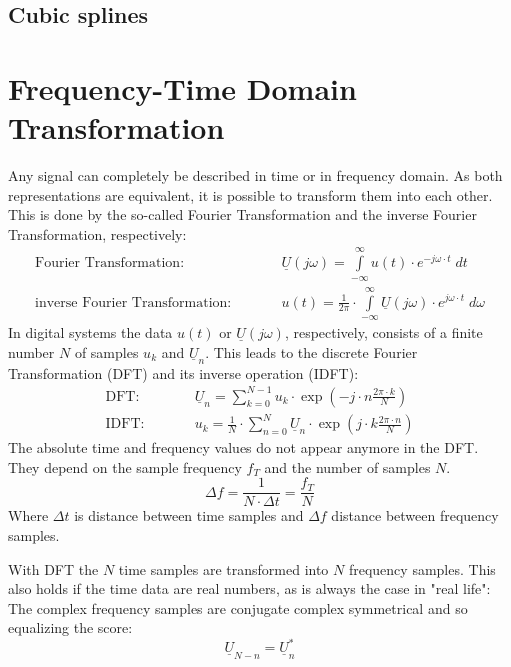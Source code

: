 \subsection{Cubic splines}


\section{Frequency-Time Domain Transformation}

Any signal can completely be described in time or in frequency domain.
As both representations are equivalent, it is possible to transform them
into each other. This is done by the so-called Fourier Transformation and
the inverse Fourier Transformation, respectively:
\begin{eqnarray}
\text{Fourier Transformation:} & \qquad &
     \underline{U}(j\omega) =
     \int\limits_{-\infty}^{\infty} u(t)\cdot e^{-j\omega\cdot t} \; dt \\
\text{inverse Fourier Transformation:} & \qquad &
     u(t) = \frac{1}{2\pi} \cdot \int\limits_{-\infty}^{\infty}
            \underline{U}(j\omega)\cdot e^{j\omega\cdot t} \; d\omega
\end{eqnarray}
In digital systems the data $u(t)$ or $\underline{U}(j\omega)$,
respectively, consists of a finite number $N$ of samples $u_k$ and
$\underline{U}_n$. This leads to the discrete Fourier Transformation
(DFT) and its inverse operation (IDFT):
\begin{eqnarray}
\label{eqn:DFT}
\text{DFT:} & \qquad &
     \underline{U}_n =
     \sum_{k=0}^{N-1} u_k\cdot \exp\left( -j\cdot n\frac{2\pi\cdot k}{N} \right) \\
\label{eqn:IDFT}
\text{IDFT:} & \qquad &
     u_k = \frac{1}{N} \cdot \sum_{n=0}^{N}
            \underline{U}_n\cdot \exp\left( j\cdot k\frac{2\pi\cdot n}{N} \right)
\end{eqnarray}
The absolute time and frequency values do not appear anymore in the DFT.
They depend on the sample frequency $f_T$ and the number of samples $N$.
\begin{equation}
\Delta f = \frac{1}{N\cdot\Delta t} = \frac{f_T}{N}
\end{equation}
Where $\Delta t$ is distance between time samples and $\Delta f$
distance between frequency samples.

\addvspace{12pt}

With DFT the $N$ time samples are transformed into $N$ frequency samples.
This also holds if the time data are real numbers, as is always
the case in "real life": The complex frequency samples are conjugate
complex symmetrical and so equalizing the score:
\begin{equation}
\underline{U}_{N-n} = \underline{U}_n^*
\end{equation}

